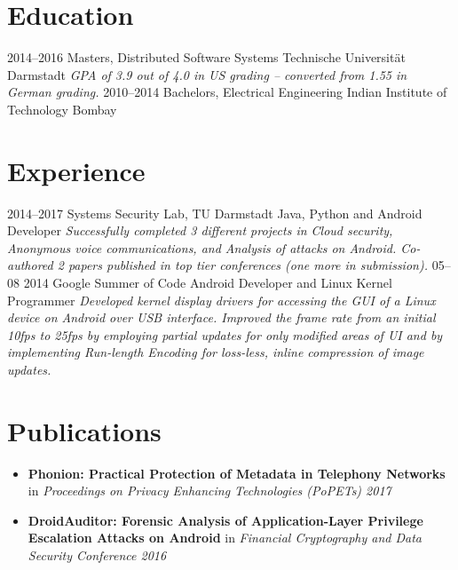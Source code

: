 \documentclass[]{friggeri-cv}
\begin{document}
\section{Education}
\begin{entrylist}
  \entry
    {2014–2016}
    {Masters, {\normalfont Distributed Software Systems}}
    {Technische Universität Darmstadt}
    {\emph{GPA of 3.9 out of 4.0 in US grading -- converted from 1.55 in German grading.}}
  \entry
    {2010–2014}
    {Bachelors, {\normalfont Electrical Engineering}}
    {Indian Institute of Technology Bombay}
    {}%
\end{entrylist}

\section{Experience}
\begin{entrylist}
  \entry
    {2014–2017}
    {Systems Security Lab, TU Darmstadt}
    {Java, Python and Android Developer}
    {\emph{Successfully completed 3 different projects in Cloud security, Anonymous voice communications, and Analysis of attacks on Android. Co-authored 2 papers published in top tier conferences (one more in submission).}}
  \entry
    {05–08 2014}
    {Google Summer of Code}
    {Android Developer and Linux Kernel Programmer}
    {\emph{Developed kernel display drivers for accessing the GUI of a Linux device on Android over USB interface. Improved the frame rate from an initial 10fps to 25fps by employing partial updates for only modified areas of UI and by implementing Run-length Encoding for loss-less, inline compression of image updates.}}
\end{entrylist}

\section{Publications}
\begin{itemize}
  \item \textbf{Phonion: Practical Protection of Metadata in Telephony Networks} in \textit{Proceedings on Privacy Enhancing Technologies (PoPETs) 2017}
  \item \textbf{DroidAuditor: Forensic Analysis of Application-Layer Privilege Escalation Attacks on Android} in \textit{Financial Cryptography and Data Security Conference 2016}
\end{itemize}
\vspace{0.3cm}
\end{document}
